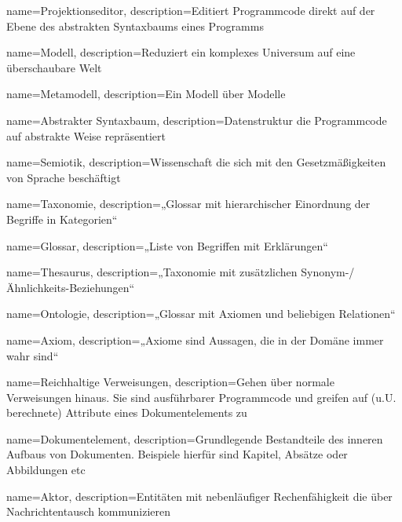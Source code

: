 {
  name=Projektionseditor,
  description={Editiert Programmcode direkt auf der Ebene des
               abstrakten Syntaxbaums eines Programms}
}

{
  name=Modell,
  description={Reduziert ein komplexes Universum auf eine überschaubare Welt}
}

{
  name=Metamodell,
  description={Ein Modell über Modelle}
}

{
  name=Abstrakter Syntaxbaum,
  description={Datenstruktur die Programmcode auf abstrakte Weise repräsentiert}
}

{
  name=Semiotik,
  description={Wissenschaft die sich mit den Gesetzmäßigkeiten von Sprache beschäftigt}
}

{
  name=Taxonomie,
  description={„Glossar mit hierarchischer Einordnung der Begriffe in Kategorien“ \citep[S. 3-4]{Drachenfels}}
}

{
  name=Glossar,
  description={„Liste von Begriffen mit Erklärungen“ \citep[S. 3-4]{Drachenfels}}
}

{
  name=Thesaurus,
  description={„Taxonomie mit zusätzlichen Synonym-/Ähnlichkeits-Beziehungen“ \citep[S. 3-4]{Drachenfels}}
}

{
  name=Ontologie,
  description={„Glossar mit Axiomen und beliebigen Relationen“ \citep[S. 3-4]{Drachenfels}}
}

{
  name=Axiom,
  description={„Axiome sind Aussagen, die in der Domäne immer wahr sind“ \citep[S. 3-4]{Drachenfels}}
}


{
  name=Reichhaltige Verweisungen,
  description={Gehen über normale Verweisungen hinaus. Sie sind ausführbarer Programmcode und greifen auf (u.U. berechnete) Attribute eines Dokumentelements zu}
}

{
  name=Dokumentelement,
  description={Grundlegende Bestandteile des inneren Aufbaus von Dokumenten.
  Beispiele hierfür sind Kapitel, Absätze oder Abbildungen etc}
}

{
  name=Aktor,
  description={Entitäten mit nebenläufiger Rechenfähigkeit die über Nachrichtentausch kommunizieren}
}

